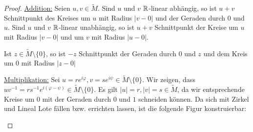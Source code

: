 \begin{proof}
	\underline{Addition:} Seien $u, v \in \tilde{M}$. Sind $u$ und $v$ $\mathbb{R}$-linear abhängig, so ist $u + v$ Schnittpunkt des Kreises um $u$ mit Radius $|v-0|$ und der Geraden durch $0$ und $u$. Sind $u$ und $v$ $\mathbb{R}$-linear unabhängig, so ist $u+v$ Schnittpunkt der Kreise um $u$ mit Radius $|v-0|$ und um $v$ mit Radius $|u-0|$.
	
	\begin{center}
		
	\end{center}
	
	Ist $z \in \tilde{M} \setminus \{0\}$, so ist $-z$ Schnittpunkt der Geraden durch $0$ und $z$ und dem Kreis um $0$ mit Radius $|z-0|$
	
	\underline{Multiplikation:} Sei $u = re^{i\varphi}, v = se^{i\psi} \in \tilde{M} \setminus \{0\}$. Wir zeigen, dass $uv^{-1} = rs^{-1} e^{i(\varphi - \psi)} \in \tilde{M} \setminus \{0\}$. Es gilt $|u| = r, |v| = s \in \tilde{M}$, da wir entsprechende Kreise um $0$ mit der Geraden durch $0$ und $1$ schneiden können. Da sich mit Zirkel und Lineal Lote fällen bzw. errichten lassen, ist die folgende Figur konstruierbar:
	
	\begin{center}
\end{center}
\end{proof}
